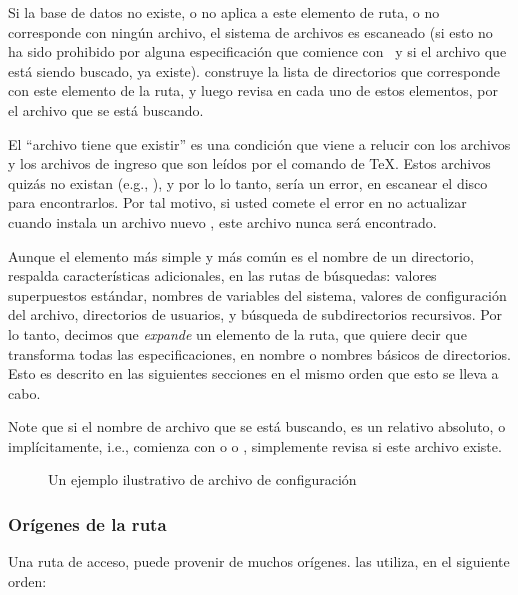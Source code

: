 \documentclass{article}
\begin{document}
Si la base de datos no existe, o no aplica a este elemento de
ruta, o no corresponde con ningún archivo, el sistema de
archivos es escaneado (si esto no ha sido prohibido por alguna
especificación que comience con \samp{!!}\ y si el archivo que
está siendo buscado, ya existe). \KPS{} construye la
lista de directorios que corresponde con este elemento de la
ruta, y luego revisa en cada uno de estos elementos, por el
archivo que se está buscando. 

El ``archivo tiene que existir'' es una condición que viene a
relucir con los archivos  y los archivos de ingreso
que son leídos por el comando  de \TeX{}. Estos
archivos quizás no existan (e.g., ), y por lo
lo tanto, sería un error, en escanear el disco para
encontrarlos. Por tal motivo, si usted comete el error en no
actualizar  cuando instala un archivo nuevo
, este archivo nunca será encontrado. 

Aunque el elemento más simple y más común es el nombre de un
directorio, \KPS{} respalda características adicionales, en las
rutas de búsquedas: valores superpuestos estándar, nombres de
variables del sistema, valores de configuración del archivo,
directorios de usuarios, y búsqueda de subdirectorios
recursivos. Por lo tanto, decimos que \KPS{} \emph{expande} un
elemento de la ruta, que quiere decir que transforma todas las
especificaciones, en nombre o nombres básicos de directorios.
Esto es descrito en las siguientes secciones en el mismo
orden que esto se lleva a cabo. 

Note que si el nombre de archivo que se está buscando, es un
relativo absoluto, o implícitamente, i.e., comienza con
\samp{/} o  o , \KPS{} simplemente revisa
si este archivo existe. 

\ifSingleColumn
\else
\begin{figure*}

\setlength{\abovecaptionskip}{0pt}
\caption{Un ejemplo ilustrativo de archivo de configuración}
  \label{fig:config-sample}
\end{figure*}
\fi

\subsubsection{Orígenes de la ruta}
\label{sec:path-sources}

Una ruta de acceso, puede provenir de muchos orígenes.
\KPS{} las utiliza, en el siguiente orden:
\end{document}
